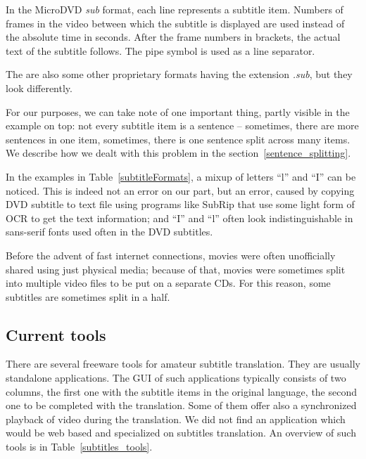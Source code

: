 In the MicroDVD \emph{sub} format, each line represents a subtitle item. Numbers of frames in the video between which the subtitle is displayed are used instead of the absolute time in seconds. After the frame numbers in brackets, the actual text of the subtitle follows. The pipe symbol is used as a line separator.

The are also some other proprietary formats having the extension \emph{.sub}, but they look differently.

For our purposes, we can take note of one important thing, partly visible in the example on top: not every subtitle item is a sentence -- sometimes, there are more sentences in one item, sometimes, there is one sentence split across many items. We describe how we dealt with this problem in the section~\ref{sentence_splitting}.

In the examples in Table~\ref{subtitleFormats}, a mixup of letters ``l'' and ``I'' can be noticed. This is indeed not an error on our part, but an error, caused by copying DVD subtitle to text file using programs like SubRip that use some light form of OCR to get the text information; and ``I'' and ``l'' often look indistinguishable in sans-serif fonts used often in the DVD subtitles.

Before the advent of fast internet connections, movies were often unofficially shared using just physical media; because of that, movies were sometimes split into multiple video files to be put on a separate CDs. For this reason, some subtitles are sometimes split in a half.

\subsection{Current tools}

There are several freeware tools for amateur subtitle translation. They are usually standalone applications. The GUI of such applications typically consists of two columns, the first one with the subtitle items in the original language, the second one to be completed with the translation. Some of them offer also a synchronized playback of video during the translation. We did not find an application which would be web based and specialized on subtitles translation. An overview of such tools is in Table~\ref{subtitles_tools}.

